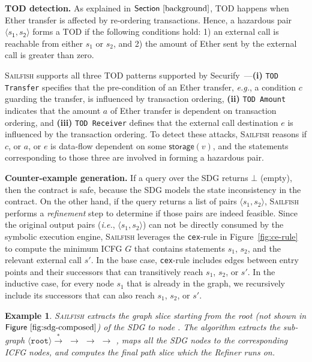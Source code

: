 \documentclass[conference, romanappendices]{tex/IEEEtran}
\theoremstyle{bfnote}
\newcommand{\toolname}{\textsc{Sailfish}\xspace}
\newcommand{\refiner}{{\sc Refiner}\xspace}
\newcommand{\securify}{{\sc Securify}\xspace}
\newcommand{\ether}{{Ether}\xspace}
\newcommand{\eg}{\textit{e.g.}}
\newcommand{\ie}{\textit{i.e.}}
\newcommand{\Fig}[1]{\ensuremath{\sf Figure~\ref{#1}}}
\newcommand{\Sect}[1]{\ensuremath{\sf Section~\ref{#1}}}
\newcommand*\circledtext[1]{\tikz[baseline=(char.base)]{\node[shape=circle,fill,inner sep=1pt] (char) {\textcolor{white}{\small{#1}}};}}
\newtheorem{example}{Example}
\begin{document}
\vspace{-2mm}
\noindent
\textbf{TOD detection.}
As explained in \Sect{background}, {TOD\EndAccSupp{}} happens when \ether transfer is affected by re-ordering transactions.
Hence, a hazardous pair $\langle s_{\mathsf{1}}, s_{\mathsf{2}} \rangle$ forms a {TOD\EndAccSupp{}} if the following conditions hold: 1) an external call is reachable from either $s_1$ or $s_2$, and 2) the amount of \ether sent by the external call is greater than zero.

\toolname supports all three {TOD\EndAccSupp{}} patterns supported by \securify~\cite{securify}---\textbf{(i)} \texttt{TOD Transfer} specifies that the pre-condition of an \ether transfer, \eg, a condition $c$ guarding the transfer, is influenced by transaction ordering,
\textbf{(ii)} \texttt{TOD Amount} indicates that the amount $a$ of \ether transfer is dependent on transaction ordering, and
\textbf{(iii)} \texttt{TOD Receiver} defines that the external call destination $e$ is influenced by the transaction ordering.
To detect these attacks, \toolname reasons if $c$, or $a$, or $e$ is data-flow dependent on some $\mathsf{storage}(v)$, and the statements corresponding to those three are involved in forming a hazardous pair.

\noindent
\textbf{Counter-example generation.}
If a query over the {SDG\EndAccSupp{}} returns $\bot$ (empty), then the contract is safe, because the {SDG\EndAccSupp{}} models the state inconsistency in the contract. 
On the other hand, if the query returns a list of pairs $\langle s_1, s_2 \rangle$, \toolname performs a \emph{refinement} step to determine if those pairs are indeed feasible.
Since the original output pairs (\ie, $\langle s_1, s_2 \rangle$) can not be directly consumed by the symbolic execution engine, \toolname leverages the \texttt{cex}-rule in Figure~\ref{fig:ce-rule} to compute the minimum {ICFG\EndAccSupp{}} $G$ that contains statements $s_1$, $s_2$, and the relevant external call $s'$. 
In the base case, \texttt{cex}-rule includes edges between entry points and their successors that can transitively reach $s_1$, $s_2$, or $s'$. In the inductive case, for every node $s_1$ that is already in the graph, we recursively include its successors that can also reach $s_1$, $s_2$, or $s'$.

\vspace{-2mm}
\begin{example}
\toolname{} extracts the graph slice starting from the root (not shown in \Fig{fig:sdg-composed}) of the {SDG\EndAccSupp{}} to node \circledtext{5}.
The algorithm extracts the sub-graph $\langle \texttt{root} \rangle \!\!\xrightarrow{*}$ \circledtext{2} $\rightarrow$ \circledtext{4} $\rightarrow$ \circledtext{5} $\rightarrow$ \circledtext{3}, maps all the {SDG\EndAccSupp{}} nodes to the corresponding {ICFG\EndAccSupp{}} nodes, and computes the final path slice which the \refiner{} runs on.
\end{example}
\end{document}
